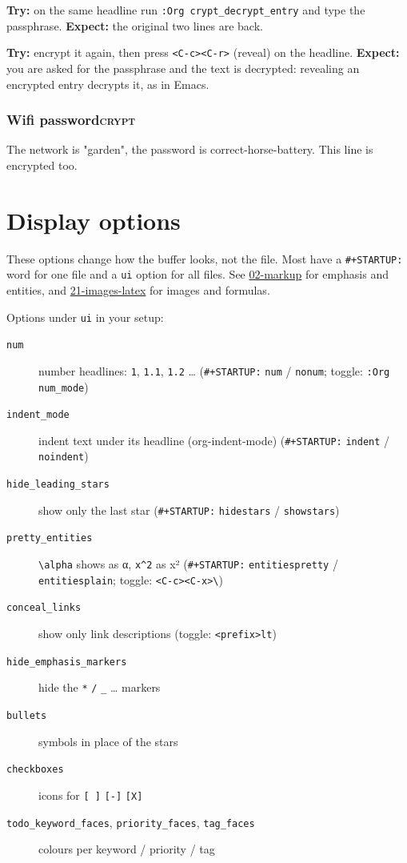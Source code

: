 \textbf{Try:} on the same headline run \texttt{:Org crypt\_decrypt\_entry} and type the
passphrase.
\textbf{Expect:} the original two lines are back.

\textbf{Try:} encrypt it again, then press \texttt{<C-c><C-r>} (reveal) on the headline.
\textbf{Expect:} you are asked for the passphrase and the text is decrypted:
revealing an encrypted entry decrypts it, as in Emacs.
\subsubsection{Wifi password\hfill{}\textsc{crypt}}
\label{sec:org74aee5d}
The network is "garden", the password is correct-horse-battery.
This line is encrypted too.
\section{Display options}
\label{sec:orgaa3a7e6}
These options change how the buffer looks, not the file. Most have a
\texttt{\#+STARTUP:} word for one file and a \texttt{ui} option for all files. See
\href{02-markup.org}{02-markup} for emphasis and entities, and
\href{21-images-latex.org}{21-images-latex} for images and formulas.

Options under \texttt{ui} in your setup:

\begin{description}
\item[{\texttt{num}}] number headlines: \texttt{1}, \texttt{1.1}, \texttt{1.2} \ldots{}
(\texttt{\#+STARTUP:} \texttt{num} / \texttt{nonum}; toggle: \texttt{:Org num\_mode})
\item[{\texttt{indent\_mode}}] indent text under its headline (org-indent-mode)
(\texttt{\#+STARTUP:} \texttt{indent} / \texttt{noindent})
\item[{\texttt{hide\_leading\_stars}}] show only the last star
(\texttt{\#+STARTUP:} \texttt{hidestars} / \texttt{showstars})
\item[{\texttt{pretty\_entities}}] \texttt{\textbackslash{}alpha} shows as α, \texttt{x\textasciicircum{}2} as x²
(\texttt{\#+STARTUP:} \texttt{entitiespretty} / \texttt{entitiesplain}; toggle: \texttt{<C-c><C-x>\textbackslash{}})
\item[{\texttt{conceal\_links}}] show only link descriptions
(toggle: \texttt{<prefix>lt})
\item[{\texttt{hide\_emphasis\_markers}}] hide the \texttt{*} \texttt{/} \texttt{\_} \ldots{} markers
\item[{\texttt{bullets}}] symbols in place of the stars
\item[{\texttt{checkboxes}}] icons for \texttt{[ ]} \texttt{[-]} \texttt{[X]}
\item[{\texttt{todo\_keyword\_faces}, \texttt{priority\_faces}, \texttt{tag\_faces}}] colours per keyword /
priority / tag
\end{description}

